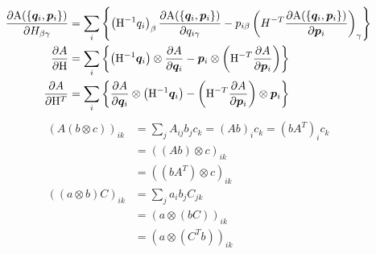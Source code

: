 \documentclass[11pt,a4paper,uplatex]{jsarticle}
\begin{document}
\begin{align}
    \frac{\partial {\rm A}(\{\bm{q}_{i}, \bm{p}_{i}\})}{\partial H_{\beta \gamma}} 
    &= \sum_{i} \left\{ \left({\rm H}^{-1} q_{i}\right)_{\beta}\frac{\partial {\rm A}(\{\bm{q}_{i}, \bm{p}_{i}\})}{\partial q_{i \gamma}} 
    -  p_{i \beta} \left( H^{-T} \frac{\partial {\rm A}(\{\bm{q}_{i}, \bm{p}_{i}\})}{\partial \bm{p}_{i}}  \right)_{\gamma} \right\} \\
    \frac{\partial A}{\partial {\rm H}} &= \sum_{i} \left\{ 
    \left({\rm H}^{-1} \bm{q}_{i} \right) \otimes \frac{\partial A }{\partial \bm{q}_{i}} 
    - \bm{p}_{i} \otimes \left( {\rm H}^{-T} \frac{\partial A }{\partial \bm{p}_{i}} \right)
    \right\}\\
    \frac{\partial A}{\partial {\rm H}^T} &= \sum_{i} \left\{ \frac{\partial A }{\partial \bm{q}_{i}} \otimes 
    \left({\rm H}^{-1} \bm{q}_{i} \right) 
    - \left( {\rm H}^{-T} \frac{\partial A }{\partial \bm{p}_{i}} \right)\otimes \bm{p}_{i} 
    \right\}
\end{align}
\begin{align}
    \left( A \left(b \otimes c\right) \right)_{ik} &= \sum_{j} A_{ij} b_{j} c_{k}  
    = (Ab)_{i} c_{k} 
    = (b A^{T})_{i} c_{k} \\
    &= \left( (Ab) \otimes c \right)_{ik}\\
    &= \left( (bA^{T}) \otimes c \right)_{ik}\\
    \left( (a \otimes b) C\right)_{ik} &= \sum_{j} a_{i} b_{j} C_{jk} \\
    &= \left( a \otimes \left(b C\right)\right)_{ik} \\
    &= \left( a \otimes \left(C^{T} b \right)\right)_{ik}
\end{align}
\end{document}
